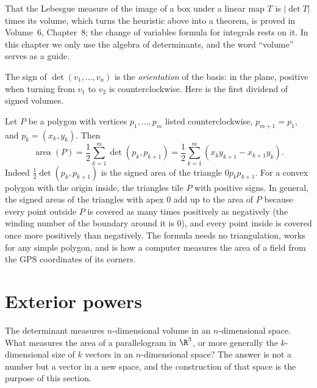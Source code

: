 \begin{remark}
That the Lebesgue measure of the image of a box under a linear map $T$ is $|\det T|$ times its volume, which turns the
heuristic above into a theorem, is proved in Volume~6, Chapter~8; the change of variables formula for integrals rests on
it. In this chapter we only use the algebra of determinants, and the word ``volume'' serves as a guide.
\end{remark}

The sign of $\det(v_1,\dots,v_n)$ is the \emph{orientation} of the basis: in the plane, positive when turning from $v_1$
to $v_2$ is counterclockwise. Here is the first dividend of signed volumes.

\begin{example}\label{linear:ex:shoelace}
Let $P$ be a polygon with vertices $p_1,\dots,p_m$ listed counterclockwise, $p_{m+1}=p_1$, and $p_k=(x_k,y_k)$. Then
\[
\operatorname{area}(P)=\frac12\sum_{k=1}^m\det(p_k,p_{k+1})=\frac12\sum_{k=1}^m(x_ky_{k+1}-x_{k+1}y_k).
\]
Indeed $\frac12\det(p_k,p_{k+1})$ is the signed area of the triangle $0p_kp_{k+1}$. For a convex polygon with the origin
inside, the triangles tile $P$ with positive signs. In general, the signed areas of the triangles with apex $0$ add up
to the area of $P$ because every point outside $P$ is covered as many times positively as negatively (the winding number
of the boundary around it is $0$), and every point inside is covered once more positively than negatively. The formula
needs no triangulation, works for any simple polygon, and is how a computer measures the area of a field from the GPS
coordinates of its corners.
\end{example}

\section{Exterior powers}\label{linear:sec:exterior}

The determinant measures $n$-dimensional volume in an $n$-dimensional space. What measures the area of a parallelogram
in $\R^3$, or more generally the $k$-dimensional size of $k$ vectors in an $n$-dimensional space? The answer is not a
number but a vector in a new space, and the construction of that space is the purpose of this section.

